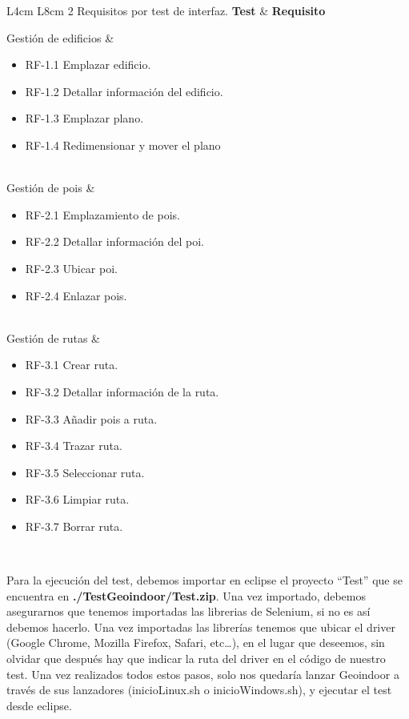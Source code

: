 {L{4cm} L{8cm}}
{2}
{Requisitos por test de interfaz.}
{\textbf{Test} & \textbf{Requisito} \\}
{Gestión de edificios 		&
	\begin{itemize}
		\item RF-1.1 Emplazar edificio.
		\item RF-1.2 Detallar información del edificio.
		\item RF-1.3 Emplazar plano.
		\item RF-1.4 Redimensionar y mover el plano
	\end{itemize}  				
	\\
	Gestión de pois &
	\begin{itemize}
		\item RF-2.1 Emplazamiento de pois.
		\item RF-2.2 Detallar información del poi.
		\item RF-2.3 Ubicar poi.
		\item RF-2.4 Enlazar pois.
	\end{itemize}
	\\  				
	Gestión de rutas &
	\begin{itemize}
		\item RF-3.1 Crear ruta.
		\item RF-3.2 Detallar información de la ruta.
		\item RF-3.3 Añadir pois a ruta.
		\item RF-3.4 Trazar ruta.
		\item RF-3.5 Seleccionar ruta.
		\item RF-3.6 Limpiar ruta.
		\item RF-3.7 Borrar ruta.
	\end{itemize}  				
	\\}

Para la ejecución del test, debemos importar en eclipse el proyecto ``Test'' que se encuentra en \textbf{./TestGeoindoor/Test.zip}. Una vez importado, debemos asegurarnos que tenemos importadas las librerias de Selenium, si no es así debemos hacerlo. Una vez importadas las librerías tenemos que ubicar el driver (Google Chrome, Mozilla Firefox, Safari, etc\ldots), en el lugar que deseemos, sin olvidar que después hay que indicar la ruta del driver en el código de nuestro test. Una vez realizados todos estos pasos, solo nos quedaría lanzar Geoindoor a través de sus lanzadores (inicioLinux.sh o inicioWindows.sh), y ejecutar el test desde eclipse.

